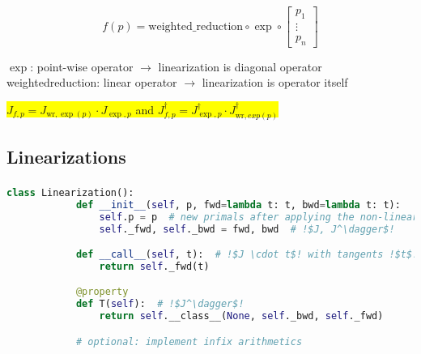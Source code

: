 \documentclass[aspectratio=169,xcolor=dvipsnames]{beamer}
\begin{document}
\begin{frame}
	\frametitle{\insertsection}
	\framesubtitle{\insertsubsection}

	\begin{equation*}
		f(p) =
		\text{weighted\_reduction}
		\circ
		\exp
		\circ
		\begin{bmatrix}
			p_{1} \\
			\vdots \\
			p_{n}
		\end{bmatrix}
	\end{equation*}

	\vspace{1em}
	$\exp$: point-wise operator $\rightarrow$ linearization is diagonal operator
	\\ weighted\textunderscore{}reduction: linear operator $\rightarrow$ linearization is operator itself

	\pause
	\vspace{2em}
	\begin{center}
		\colorbox{yellow}{
			$J_{f,p} = J_{\text{wr},\exp(p)} \cdot J_{\exp,p}$
			\hspace{2em}
			and
			\hspace{2em}
			$J_{f,p}^\dagger = J_{\exp,p}^\dagger \cdot J_{\text{wr},exp(p)}^\dagger$
		}
	\end{center}

\end{frame}

\subsection{Linearizations}
\begin{frame}[fragile]
	\frametitle{\insertsection}
	\framesubtitle{\insertsubsection}

	\begin{lstlisting}[language=python,escapechar=!]
		class Linearization():
			def __init__(self, p, fwd=lambda t: t, bwd=lambda t: t):
				self.p = p  # new primals after applying the non-linearized !$J$!
				self._fwd, self._bwd = fwd, bwd  # !$J, J^\dagger$!

			def __call__(self, t):  # !$J \cdot t$! with tangents !$t$!
				return self._fwd(t)

			@property
			def T(self):  # !$J^\dagger$!
				return self.__class__(None, self._bwd, self._fwd)

			# optional: implement infix arithmetics
	\end{lstlisting}

\end{frame}
\end{document}

